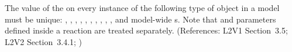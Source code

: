 The value of the   on every instance of the
following type of object in a model must be unique: \Model,
\FunctionDefinition, \CompartmentType, \Compartment, \SpeciesType,
\Species, \Reaction, \SpeciesReference, \ModifierSpeciesReference,
\Event, and model-wide \Parameter{}s.  Note that \UnitDefinition
and parameters defined inside a reaction are treated separately.
(References: L2V1 Section~3.5; L2V2 Section~3.4.1; )
